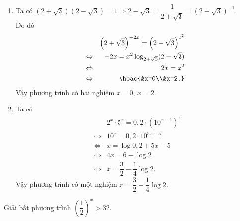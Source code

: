 \begin{bt}
{\begin{enumerate}
\begin{eqnarray*}
				 &\Leftrightarrow& x^2+(2-\log_5 2)x+(\log_5 2 -3)=0 \\
				 &\Leftrightarrow& \hoac{&x=1\\&x=-3+\log_5 2.}
			\end{eqnarray*}
			Vậy  phương trình có hai nghiệm $x=1$, $x=-3+\log_5 2$.
			 \item
			Ta có $(2+\sqrt{3})(2-\sqrt{3})=1  \Rightarrow 2-\sqrt{3}=\dfrac{1}{2+\sqrt{3}}=(2+\sqrt{3})^{-1}$.\\
			 Do đó
			\begin{eqnarray*}
				&&\left(2+\sqrt{3}\right)^{-2x}=\left(2-\sqrt{3}\right)^{x^2} \\ &\Leftrightarrow& -2x=x^2\log_{2+\sqrt{3}} (2-\sqrt{3})  \\
				&\Leftrightarrow& 2x=x^2  \\
				 &\Leftrightarrow& \hoac{&x=0\\&x=2.}\\
			\end{eqnarray*}
			Vậy phương trình có hai  nghiệm $x=0$, $x=2$.
			\item Ta  có
			\begin{eqnarray*}
				&&2^x\cdot 5^x=0{,}2\cdot \left(10^{x-1}\right)^5  \\
				 &\Leftrightarrow& 10^x=0{,}2\cdot 10^{5x-5}\\
				 &\Leftrightarrow& x=\log 0{,}2 +5x-5\\
				&\Leftrightarrow& 4x=6-\log  2\\
				&\Leftrightarrow& x=\dfrac{3}{2}-\dfrac{1}{4}\log 2. 
			\end{eqnarray*}
			Vậy phương trình có một nghiệm $x=\dfrac{3}{2}-\dfrac{1}{4}\log 2$. 
		\end{enumerate}
	 }
\end{bt}

\begin{bt}%

	Giải bất phương trình $\left(\dfrac{1}{2}\right)^x>32$.
\end{bt}

